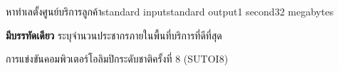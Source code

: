 \documentclass[11pt,a4paper]{article}
\begin{document}
\begin{problem}{หาทำเลตั้งศูนย์บริการลูกค้า}{standard input}{standard output}{1 second}{32 megabytes}
\OutputFile

\textbf{มีบรรทัดเดียว} ระบุจำนวนประชากรภายในพื้นที่บริการที่ดีที่สุด

\Examples

\begin{example}
%
%
\end{example}


\Source

การแข่งขันคอมพิวเตอร์โอลิมปิกระดับชาติครั้งที่ 8 (SUTOI8)

\end{problem}
\end{document}
